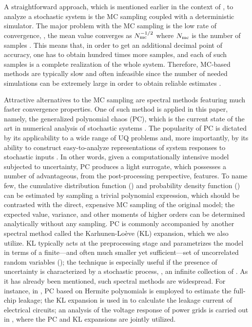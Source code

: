 
A straightforward approach, which is mentioned earlier in the context of \cite{chandra2010}, to analyze a stochastic system is the MC sampling coupled with a deterministic simulator. The major problem with the MC sampling is the low rate of convergence, \eg, the mean value converges as $N_\text{mc}^{-{{1}/{2}}}$ where $N_\text{mc}$ is the number of samples \cite{xiu2010, maitre2010}. This means that, in order to get an additional decimal point of accuracy, one has to obtain hundred times more samples, and each of such samples is a complete realization of the whole system. Therefore, MC-based methods are typically slow and often infeasible since the number of needed simulations can be extremely large in order to obtain reliable estimates \cite{diaz-emparanza2002}.

Attractive alternatives to the MC sampling are spectral methods \cite{xiu2010, maitre2010, ghanem1991} featuring much faster convergence properties. One of such method is applied in this paper, namely, the generalized polynomial chaos (PC), which is the current state of the art in numerical analysis of stochastic systems \cite{xiu2010}. The popularity of PC is dictated by its applicability to a wide range of UQ problems and, more importantly, by its ability to construct easy-to-analyze representations of system responses to stochastic inputs \cite{eldred2009}. In other words, given a computationally intensive model subjected to uncertainty, PC produces a light surrogate, which possesses a number of advantageous, from the post-processing perspective, features. To name few, the cumulative distribution function (\cdf) and probability density function (\pdf) \cite{durrett2010} can be estimated by sampling a trivial polynomial expression, which should be contrasted with the direct, expensive MC sampling of the original model; the expected value, variance, and other moments of higher orders can be determined analytically without any sampling. PC is commonly accompanied by another spectral method called the Karhunen-Lo\`{e}ve (KL) expansion, which we also utilize. KL typically acts at the preprocessing stage and parametrizes the model in terms of a finite---and often much smaller yet sufficient---set of uncorrelated random variables (\rvs); the technique is especially useful if the presence of uncertainty is characterized by a stochastic process, \ie, an infinite collection of \rvs. As it has already been mentioned, such spectral methods are widespread. For instance, in \cite{shen2009}, PC based on Hermite polynomials is employed to estimate the full-chip leakage; the KL expansion is used in \cite{bhardwaj2006} to calculate the leakage current of electrical circuits; an analysis of the voltage response of power grids is carried out in \cite{ghanta2006}, where the PC and KL expansions are jointly utilized.

